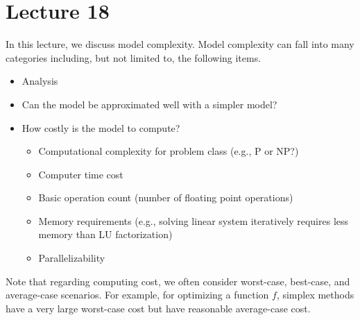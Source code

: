\chapter{Lecture 18}
In this lecture, we discuss model complexity. Model complexity can fall into many categories including, but not limited to, the following items.
\begin{itemize}
    \item Analysis 
    \item Can the model be approximated well with a simpler model?
    \item How costly is the model to compute?
    \begin{itemize}
        \item Computational complexity for problem class (e.g., P or NP?)
        \item Computer time cost 
        \item Basic operation count (number of floating point operations)
        \item Memory requirements (e.g., solving linear system iteratively requires less memory than LU factorization)
        \item Parallelizability
    \end{itemize}
\end{itemize}
Note that regarding computing cost, we often consider worst-case, best-case, and average-case scenarios. For example, for optimizing a function $f$, simplex methods have a very large worst-case cost but have reasonable average-case cost.
